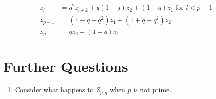 \documentclass[paper.tex]{subfiles}
\begin{document}
\begin{align}
    z_l &= q^2 z_{l + 2} + q(1 - q) z_2 + (1 - q) z_1 \text{ for } l < p -1\\
    z_{p - 1} &= (1 - q + q^2) z_1 + (1 + q - q^2) z_2 \\
    z_p  &= q z_2 + (1 - q) z_2
\end{align}

\section{Further Questions}\label{fqs}

\begin{enumerate}
\item Consider what happens to $Z_{p,q}$ when $p$ is not prime.
\end{enumerate}
\end{document}

